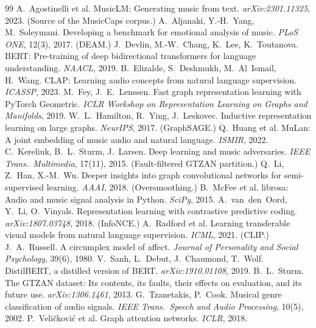 \documentclass[10pt,a4paper]{article}
\begin{document}
\begin{thebibliography}{99}\small
{} A.~Agostinelli et al. MusicLM: Generating music from
text. \emph{arXiv:2301.11325}, 2023. (Source of the MusicCaps corpus.)
 A.~Aljanaki, Y.-H.~Yang, M.~Soleymani. Developing a
benchmark for emotional analysis of music. \emph{PLoS ONE}, 12(3), 2017. (DEAM.)
 J.~Devlin, M.-W.~Chang, K.~Lee, K.~Toutanova. BERT:
Pre-training of deep bidirectional transformers for language understanding.
\emph{NAACL}, 2019.
 B.~Elizalde, S.~Deshmukh, M.~Al~Ismail, H.~Wang. CLAP:
Learning audio concepts from natural language supervision. \emph{ICASSP}, 2023.
 M.~Fey, J.~E.~Lenssen. Fast graph representation learning with
PyTorch Geometric. \emph{ICLR Workshop on Representation Learning on Graphs and
Manifolds}, 2019.
 W.~L.~Hamilton, R.~Ying, J.~Leskovec. Inductive
representation learning on large graphs. \emph{NeurIPS}, 2017. (GraphSAGE.)
 Q.~Huang et al. MuLan: A joint embedding of music audio and
natural language. \emph{ISMIR}, 2022.
 C.~Kereliuk, B.~L.~Sturm, J.~Larsen. Deep learning and
music adversaries. \emph{IEEE Trans.\ Multimedia}, 17(11), 2015.
(Fault-filtered GTZAN partition.)
 Q.~Li, Z.~Han, X.-M.~Wu. Deeper insights into graph
convolutional networks for semi-supervised learning. \emph{AAAI}, 2018.
(Oversmoothing.)
 B.~McFee et al. librosa: Audio and music signal analysis in
Python. \emph{SciPy}, 2015.
 A.~van~den~Oord, Y.~Li, O.~Vinyals. Representation learning
with contrastive predictive coding. \emph{arXiv:1807.03748}, 2018. (InfoNCE.)
 A.~Radford et al. Learning transferable visual models from
natural language supervision. \emph{ICML}, 2021. (CLIP.)
 J.~A.~Russell. A circumplex model of affect. \emph{Journal
of Personality and Social Psychology}, 39(6), 1980.
 V.~Sanh, L.~Debut, J.~Chaumond, T.~Wolf. DistilBERT, a
distilled version of BERT. \emph{arXiv:1910.01108}, 2019.
 B.~L.~Sturm. The GTZAN dataset: Its contents, its faults,
their effects on evaluation, and its future use. \emph{arXiv:1306.1461}, 2013.
 G.~Tzanetakis, P.~Cook. Musical genre classification of
audio signals. \emph{IEEE Trans.\ Speech and Audio Processing}, 10(5), 2002.
 P.~Veli\v{c}kovi\'{c} et al. Graph attention networks.
\emph{ICLR}, 2018.
\end{thebibliography}
\end{document}
